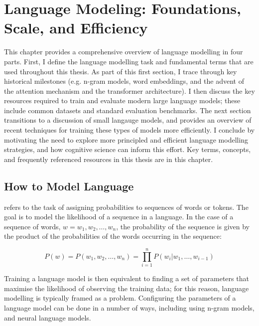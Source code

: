 \chapter{Language Modeling: Foundations, Scale, and Eﬀiciency}


This chapter provides a comprehensive overview of language modelling in four parts. First, I define the language modelling task and fundamental terms that are used throughout this thesis. As part of this first section, I trace through key historical milestones (e.g. n-gram models, word embeddings, and the advent of the attention mechanism and the transformer architecture). I then discuss the key resources required to train and evaluate modern large language models; these include common datasets and standard evaluation benchmarks. The next section transitions to a discussion of small langauge models, and provides an overview of recent techniques for training these types of models more efficiently. I conclude by motivating the need to explore more principled and efficient language modelling strategies, and how cognitive science can inform this effort. Key terms, concepts, and frequently referenced resources in this thesis are  in this chapter.

\section{How to Model Language}
\label{sec:lm-foundations}

 refers to the task of assigning probabilities to sequences of words or tokens. The goal is to model the likelihood of a sequence in a language. In the case of a sequence of words, $w = w_1, w_2, \ldots, w_n$, the probability of the sequence is given by the product of the probabilities of the words occurring in the sequence:

\begin{equation}    
    P(w) = P(w_1, w_2, \ldots, w_n) = \prod_{i=1}^n P(w_i | w_1, \ldots, w_{i-1})
\label{eq:lm-joint-distribution}
\end{equation}

Training a language model is then equivalent to finding a set of parameters that maximise the likelihood of observing the training data; for this reason, language modelling is typically framed as a  problem. Configuring the parameters of a language model can be done in a number of ways, including using n-gram models, and neural language models.

